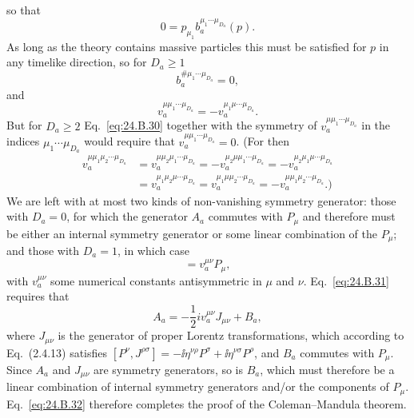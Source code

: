so that
\begin{equation}
 0=p_{\mu_1}b_a^{\mu_1\cdots\mu_{D_a}}(p).
\tag{24.B.28}\label{eq:24.B.28}
\end{equation}
As long as the theory contains massive particles this must be satisfied for
$p$ in any timelike direction, so for $D_a\geq1$
\begin{equation}
 b_a^{\#\mu_1\cdots\mu_{D_a}}=0,
\tag{24.B.29}\label{eq:24.B.29}
\end{equation}
and
\begin{equation}
 v_a^{\mu\mu_1\cdots\mu_{D_a}}
 =-v_a^{\mu_1\mu\cdots\mu_{D_a}}.
\tag{24.B.30}\label{eq:24.B.30}
\end{equation}
But for $D_a\geq2$ Eq.~\eqref{eq:24.B.30} together with the symmetry of
$v_a^{\mu\mu_1\cdots\mu_{D_a}}$ in the indices
$\mu_1\cdots\mu_{D_a}$ would require that
$v_a^{\mu\mu_1\cdots\mu_{D_a}}=0$. (For then
\[
\begin{aligned}
 v_a^{\mu\mu_1\mu_2\cdots\mu_{D_a}}
 &=v_a^{\mu\mu_2\mu_1\cdots\mu_{D_a}}
 =-v_a^{\mu_2\mu\mu_1\cdots\mu_{D_a}}
 =-v_a^{\mu_2\mu_1\mu\cdots\mu_{D_a}}
 \\
 &=v_a^{\mu_1\mu_2\mu\cdots\mu_{D_a}}
 =v_a^{\mu_1\mu\mu_2\cdots\mu_{D_a}}
 =-v_a^{\mu\mu_1\mu_2\cdots\mu_{D_a}}\text{.)}
\end{aligned}
\]
We are left with at most two kinds of non-vanishing symmetry generator: those
with $D_a=0$, for which the generator $A_a$ commutes with $P_\mu$
and therefore must be either an internal symmetry generator or some linear
combination of the $P_\mu$; and those with $D_a=1$, in which case
\begin{equation}
 [P^\nu,A_a]=v_a^{\mu\nu}P_\mu,
\tag{24.B.31}\label{eq:24.B.31}
\end{equation}
with $v_a^{\mu\nu}$ some numerical constants antisymmetric in $\mu$ and
$\nu$. Eq.~\eqref{eq:24.B.31} requires that
\begin{equation}
 A_a=-\frac{1}{2}i v_a^{\mu\nu}J_{\mu\nu}+B_a,
\tag{24.B.32}\label{eq:24.B.32}
\end{equation}
\begingroup
\setlength{\emergencystretch}{10pt}
where $J_{\mu\nu}$ is the generator of proper Lorentz transformations, which
according to Eq.~(2.4.13) satisfies
$[P^\nu,J^{\rho\sigma}]
=-\ii\eta^{\nu\rho}P^\sigma\allowbreak
{}+\ii\eta^{\nu\sigma}P^\rho$, and $B_a$ commutes
with $P_\mu$. Since $A_a$ and $J_{\mu\nu}$ are symmetry generators, so is
$B_a$, which must therefore be a linear combination of internal symmetry
generators and/or the components of $P_\mu$. Eq.~\eqref{eq:24.B.32} therefore
completes the proof of the Coleman--Mandula theorem.
\par
\endgroup

